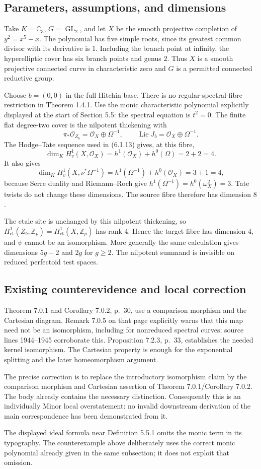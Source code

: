 \documentclass[10pt]{article}
\begin{document}
\subsection*{Parameters, assumptions, and dimensions}
Take \(K=\mathbb C_3\), \(G=\operatorname{GL}_2\), and let \(X\) be the smooth projective completion of \(y^2=x^5-x\). The polynomial has five simple roots, since its greatest common divisor with its derivative is \(1\). Including the branch point at infinity, the hyperelliptic cover has six branch points and genus \(2\). Thus \(X\) is a smooth projective connected curve in characteristic zero and \(G\) is a permitted connected reductive group.\par
Choose \(b=(0,0)\) in the full Hitchin base. There is no regular-spectral-fibre restriction in Theorem 1.4.1. Use the monic characteristic polynomial explicitly displayed at the start of Section 5.5: the spectral equation is \(t^2=0\). The finite flat degree-two cover is the nilpotent thickening with \[\pi_*\mathcal O_{Z_b}=\mathcal O_X\oplus\Omega^{-1},
 \qquad \operatorname{Lie}J_b=\mathcal O_X\oplus\Omega^{-1}.\] The Hodge–Tate sequence used in (6.1.13) gives, at this fibre, \[\dim_K H_v^1(X,\mathcal O_X)=h^1(\mathcal O_X)+h^0(\Omega)=2+2=4.\] It also gives \[\dim_K H_v^1(X,\nu^*\Omega^{-1})
 =h^1(\Omega^{-1})+h^0(\mathcal O_X)=3+1=4,\] because Serre duality and Riemann–Roch give \(h^1(\Omega^{-1})=h^0(\omega_X^2)=3\). Tate twists do not change these dimensions. The source fibre therefore has dimension \(8\).\par
The etale site is unchanged by this nilpotent thickening, so \(H^1_{\mathrm{et}}(Z_b,\mathbb Z_p)=H^1_{\mathrm{et}}(X,\mathbb Z_p)\) has rank \(4\). Hence the target fibre has dimension \(4\), and \(\psi\) cannot be an isomorphism. More generally the same calculation gives dimensions \(5g-2\) and \(2g\) for \(g\geq2\). The nilpotent summand is invisible on reduced perfectoid test spaces.\par
\subsection*{Existing counterevidence and local correction}
Theorem 7.0.1 and Corollary 7.0.2, p. 30, use a comparison morphism and the Cartesian diagram. Remark 7.0.5 on that page explicitly warns that this map need not be an isomorphism, including for nonreduced spectral curves; source lines 1944–1945 corroborate this. Proposition 7.2.3, p. 33, establishes the needed kernel isomorphism. The Cartesian property is enough for the exponential splitting and the later homeomorphism argument.\par
The precise correction is to replace the introductory isomorphism claim by the comparison morphism and Cartesian assertion of Theorem 7.0.1/Corollary 7.0.2. The body already contains the necessary distinction. Consequently this is an individually Minor local overstatement: no invalid downstream derivation of the main correspondence has been demonstrated from it.\par
The displayed ideal formula near Definition 5.5.1 omits the monic term in its typography. The counterexample above deliberately uses the correct monic polynomial already given in the same subsection; it does not exploit that omission.\par
\end{document}
